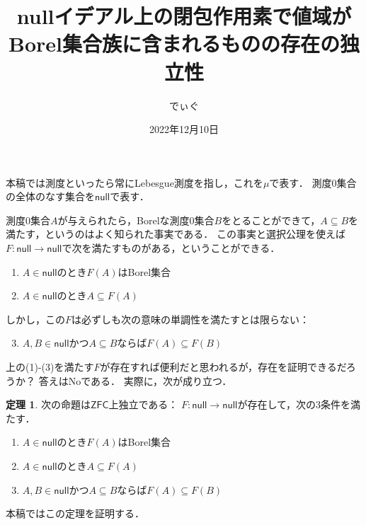 \documentclass[uplatex,dvipdfmx]{jsarticle}
\title{nullイデアル上の閉包作用素で値域がBorel集合族に含まれるものの存在の独立性}
\author{でぃぐ}
\date{2022年12月10日}
\newcommand{\nul}{\mathsf{null}}
\newcommand{\ZFC}{\mathsf{ZFC}}
\renewcommand\subset{\subseteq}
\theoremstyle{definition}
\newtheorem{thm}{定理}
\begin{document}
	\maketitle
	
	本稿では測度といったら常にLebesgue測度を指し，これを$\mu$で表す．
	測度$0$集合の全体のなす集合を$\nul$で表す．
	
	測度$0$集合$A$が与えられたら，Borelな測度$0$集合$B$をとることができて，$A \subset B$を満たす，というのはよく知られた事実である．
	この事実と選択公理を使えば$F \colon \nul \to \nul$で次を満たすものがある，ということができる．
	\begin{enumerate}
		\item $A \in \nul$のとき$F(A)$はBorel集合
		\item $A \in \nul$のとき$A \subset F(A)$
	\end{enumerate}
	しかし，この$F$は必ずしも次の意味の単調性を満たすとは限らない：
	\begin{enumerate}
	\setcounter{enumi}{2}
		\item $A, B \in \nul$かつ$A \subset B$ならば$F(A) \subset F(B)$
	\end{enumerate}
	上の(1)-(3)を満たす$F$が存在すれば便利だと思われるが，存在を証明できるだろうか？ 答えはNoである．
	実際に，次が成り立つ．
	
	\begin{thm}\label{thm:mainthm}
		次の命題は$\ZFC$上独立である：
		$F \colon \nul \to \nul$が存在して，次の3条件を満たす．
		\begin{enumerate}
			\item $A \in \nul$のとき$F(A)$はBorel集合
			\item $A \in \nul$のとき$A \subset F(A)$
			\item $A, B \in \nul$かつ$A \subset B$ならば$F(A) \subset F(B)$
		\end{enumerate}
	\end{thm}

	本稿ではこの定理を証明する．
	
\end{document}
